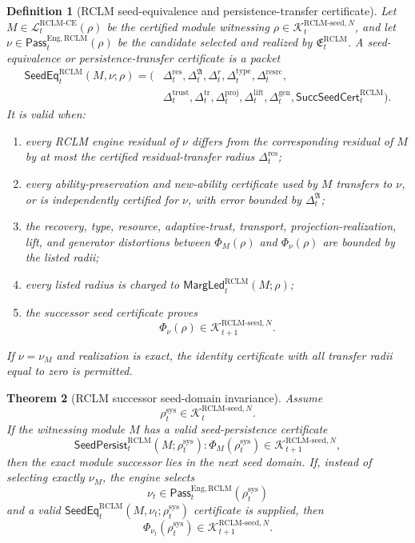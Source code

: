 \documentclass[11pt,a4paper]{article}
\newtheorem{theorem}{Theorem}[section]
\newtheorem{definition}[theorem]{Definition}
\newcommand{\Lcal}{\mathcal L}
\newcommand{\Kcal}{\mathcal K}
\newcommand{\RCLM}{\mathrm{RCLM}}
\newcommand{\sys}{\mathrm{sys}}
\newcommand{\CE}{\mathrm{CE}}
\newcommand{\Eng}{\mathrm{Eng}}
\begin{document}
\begin{definition}[RCLM seed-equivalence and persistence-transfer certificate]
\label{def:rclm-batch11-seed-equivalence-transfer}
Let \(M\in\Lcal_t^{\RCLM\text{-}\CE}(\rho)\) be the certified module witnessing \(\rho\in\Kcal_t^{\RCLM\text{-}\mathrm{seed},N}\), and let \(\nu\in\mathsf{Pass}_t^{\Eng,\RCLM}(\rho)\) be the candidate selected and realized by \(\mathfrak E_t^{\RCLM}\).  A seed-equivalence or persistence-transfer certificate is a packet
\[
\begin{aligned}
\mathsf{SeedEq}_t^{\RCLM}(M,\nu;\rho)=(&
\Delta_t^{\mathrm{res}},\Delta_t^{\mathfrak A},
\Delta_t^r,\Delta_t^{\mathrm{type}},\Delta_t^{\mathrm{resrc}},\\
&\Delta_t^{\mathrm{trust}},\Delta_t^{\mathrm{tr}},\Delta_t^{\mathrm{proj}},
\Delta_t^{\mathrm{lift}},\Delta_t^{\mathrm{gen}},
\mathsf{SuccSeedCert}_t^{\RCLM}).
\end{aligned}
\]
It is valid when:
\begin{enumerate}[label=(\roman*),leftmargin=1.5em]
    \item every RCLM engine residual of \(\nu\) differs from the corresponding residual of \(M\) by at most the certified residual-transfer radius \(\Delta_t^{\mathrm{res}}\);
    \item every ability-preservation and new-ability certificate used by \(M\) transfers to \(\nu\), or is independently certified for \(\nu\), with error bounded by \(\Delta_t^{\mathfrak A}\);
    \item the recovery, type, resource, adaptive-trust, transport, projection-realization, lift, and generator distortions between \(\Phi_M(\rho)\) and \(\Phi_\nu(\rho)\) are bounded by the listed radii;
    \item every listed radius is charged to \(\mathsf{MargLed}_t^{\RCLM}(M;\rho)\);
    \item the successor seed certificate proves
    \[
    \Phi_\nu(\rho)\in\Kcal_{t+1}^{\RCLM\text{-}\mathrm{seed},N}.
    \]
\end{enumerate}
If \(\nu=\nu_M\) and realization is exact, the identity certificate with all transfer radii equal to zero is permitted.
\end{definition}

\begin{theorem}[RCLM successor seed-domain invariance]
\label{thm:rclm-batch11-successor-seed-invariance}
Assume
\[
\rho_t^{\sys}\in\Kcal_t^{\RCLM\text{-}\mathrm{seed},N}.
\]
If the witnessing module \(M\) has a valid seed-persistence certificate
\[
\mathsf{SeedPersist}_t^{\RCLM}(M;\rho_t^{\sys}):
\Phi_M(\rho_t^{\sys})\in\Kcal_{t+1}^{\RCLM\text{-}\mathrm{seed},N},
\]
then the exact module successor lies in the next seed domain.
If, instead of selecting exactly \(\nu_M\), the engine selects
\[
\nu_t\in\mathsf{Pass}_t^{\Eng,\RCLM}(\rho_t^{\sys})
\]
and a valid \(\mathsf{SeedEq}_t^{\RCLM}(M,\nu_t;\rho_t^{\sys})\) certificate is supplied, then
\[
\Phi_{\nu_t}(\rho_t^{\sys})
\in
\Kcal_{t+1}^{\RCLM\text{-}\mathrm{seed},N}.
\]
\end{theorem}
\end{document}
